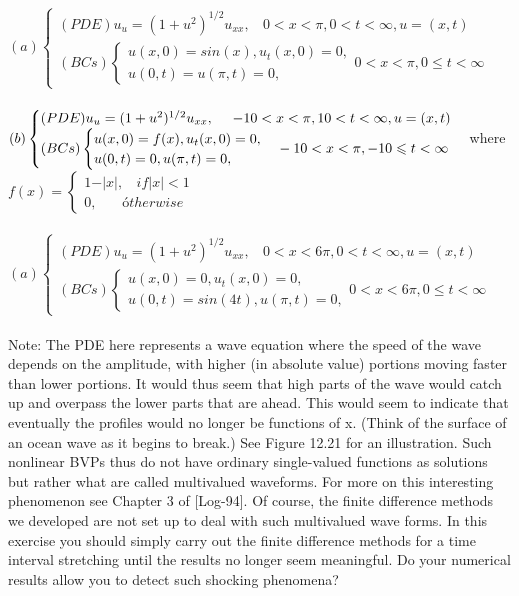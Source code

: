 \documentclass[../main.tex]{subfiles}
\begin{document}
\begin{enumerate}
\\
\\
$	(a)\begin{cases} 
	(PDE) u_u=(1+u^2)^{1/2}u_{xx},
	~~~~0<x<\pi, 0<t<\infty,u=(x,t)\\
(BCs)
		\begin{cases}
		u(x,0)=sin(x), u_t(x,0)=0,\\
		u(0,t)=u(\pi,t)=0,
		\end{cases}
		0<x<\pi, 0\leqslant t< \infty 
	\end{cases}$
\\
\\
$	(b)\begin{cases} 
	(PDE) u_u=(1+u^2)^{1/2}u_{xx},
	~~~~-10<x<\pi, 10<t<\infty,u=(x,t)\\
(BCs)
		\begin{cases}
		u(x,0)=f(x), u_t(x,0)=0,\\
		u(0,t)=0,u(\pi,t)=0,
		\end{cases}
		-10<x<\pi, -10\leqslant t< \infty 
	\end{cases}\\
	$where$ f(x)= \begin{cases}
	1-\vert x \vert, ~~~~if\vert x\vert<1\\
	0,~~~~~~~~ótherwise
	\end{cases}$
\\
\\
$	(a)\begin{cases} 
	(PDE) u_u=(1+u^2)^{1/2}u_{xx},
	~~~~0<x<6\pi, 0<t<\infty,u=(x,t)\\
(BCs)
		\begin{cases}
		u(x,0)=0, u_t(x,0)=0,\\
		u(0,t)=sin(4t),u(\pi, t)=0,
		\end{cases}
		0<x<6\pi, 0\leqslant t< \infty 
	\end{cases}$
\\
\\Note: The PDE here represents a wave equation where the speed of the wave depends on the amplitude, with higher (in absolute value) portions moving faster than lower portions. It would thus seem that high parts of the wave would catch up and overpass the lower parts that are ahead. This would seem to indicate that eventually the profiles would no longer be functions of x. (Think of the surface of an ocean wave as it begins to break.) See Figure 12.21 for an illustration. Such nonlinear BVPs thus do not have ordinary single-valued functions as solutions but rather what are called multivalued waveforms. For more on this interesting phenomenon see Chapter 3 of [Log-94]. Of course, the finite difference methods we developed are not set up to deal with such multivalued wave forms. In this exercise you should simply carry out the finite difference methods for a time interval stretching until the results no longer seem meaningful. Do your numerical results allow you to detect such shocking phenomena? 

\end{enumerate}
\end{document}
